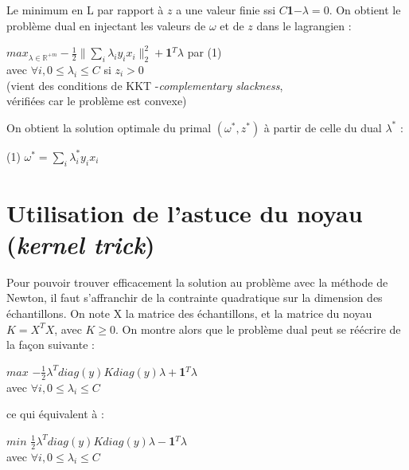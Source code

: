 \documentclass{article}
\begin{document}
Le minimum en L par rapport à $z$ a une valeur finie ssi $C$\textbf{1}$ - \lambda = 0$. On obtient le problème dual en injectant les valeurs de $\omega$ et de $z$ dans le lagrangien :\\

             \begin{center}
             $max_{\lambda \in \mathbb{R}^{+m}} -\frac{1}{2}\|\sum_i\lambda_iy_ix_i\|^2_2 + $\textbf{1}$^T\lambda$ par (1)\\ 
             avec $\forall i, 0 \leq \lambda_i \leq C$ si $z_i > 0$\\
            (vient des conditions de KKT -\emph{complementary slackness},\\
            vérifiées car le problème est convexe)\\
             \end{center}

On obtient la solution optimale du primal $(\omega^*, z^*)$ à partir de celle du dual $\lambda^*$ :

             \begin{center}
             (1) $\omega^{*} = \sum_i \lambda^{*}_i y_i x_i$
             \end{center}

\section{Utilisation de l'astuce du noyau (\emph{kernel trick})}

Pour pouvoir trouver efficacement la solution au problème avec la méthode de Newton, il faut s'affranchir de la contrainte quadratique sur la dimension des échantillons. On note X la matrice des échantillons, et la matrice du noyau $K = X^TX$, avec $K \geq 0$. On montre alors que le problème dual peut se réécrire de la façon suivante :\\

                 \begin{center}
                 $max$ $-\frac{1}{2}\lambda^Tdiag(y)Kdiag(y)\lambda+$\textbf{1}$^T\lambda$\\
                 avec $\forall i, 0 \leq \lambda_i \leq C$ 
                 \end{center}

ce qui équivalent à :\\

            \begin{center}
                 $min$ $\frac{1}{2}\lambda^Tdiag(y)Kdiag(y)\lambda-$\textbf{1}$^T\lambda$\\
                 avec $\forall i, 0 \leq \lambda_i \leq C$ 
                 \end{center}
\end{document}
